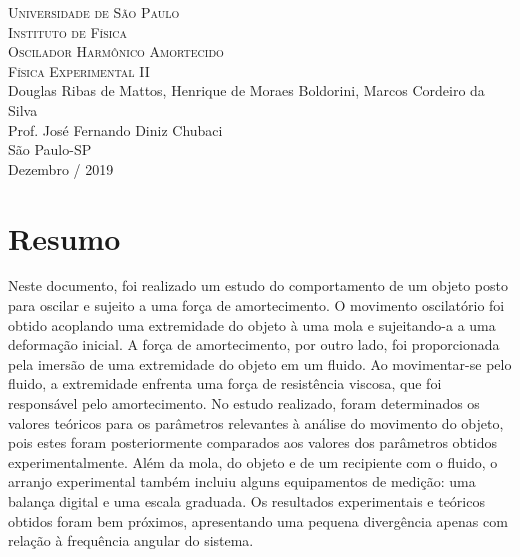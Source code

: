 \documentclass[12pt]{article}
\begin{document}
	\begin{titlepage}
		\noindent
		\newline 
		\begin{center}
			{\Large \textsc{Universidade de São Paulo} } \\ [1.5ex]
			{\Large \textsc{Instituto de Física} } \\ [45ex]
			{\Huge \textsc{Oscilador Harmônico Amortecido}} \\ [3ex]
			{\Large \textsc{Física Experimental II}} \\ [25ex] 			
			{\Large Douglas Ribas de Mattos, Henrique de Moraes Boldorini, Marcos Cordeiro da Silva} \\ [1.5ex]
			{\Large Prof. José Fernando Diniz Chubaci} \\ [3ex] \vfill
			{\Large São Paulo-SP} \\ [1.5ex] 
			{\Large Dezembro / 2019}
		\end{center}\vspace{1ex}
	\end{titlepage}
	
	\section*{Resumo}
		Neste documento, foi realizado um estudo do comportamento de um objeto posto para oscilar e sujeito a uma força de amortecimento. O movimento oscilatório foi obtido acoplando uma extremidade do objeto à uma mola e sujeitando-a a uma deformação inicial. A força de amortecimento, por outro lado, foi proporcionada pela imersão de uma extremidade do objeto em um fluido. Ao movimentar-se pelo fluido, a extremidade enfrenta uma força de resistência viscosa, que foi responsável pelo amortecimento. No estudo realizado, foram determinados os valores teóricos para os parâmetros relevantes à análise do movimento do objeto, pois estes foram posteriormente comparados aos valores dos parâmetros obtidos experimentalmente. Além da mola, do objeto e de um recipiente com o fluido, o arranjo experimental também incluiu alguns equipamentos de medição: uma balança digital e uma escala graduada. Os resultados experimentais e teóricos obtidos foram bem próximos, apresentando uma pequena divergência apenas com relação à frequência angular do sistema.
		 
\end{document}

